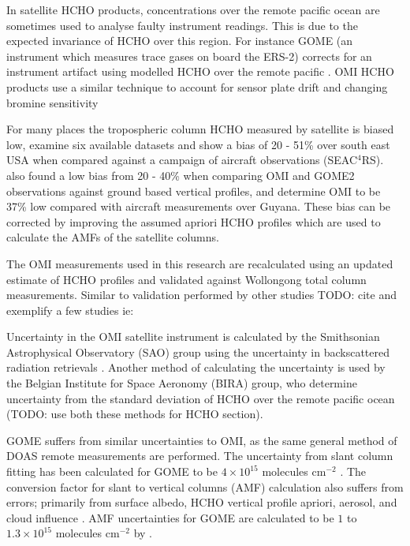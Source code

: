     In satellite HCHO products, concentrations over the remote pacific ocean are sometimes used to analyse faulty instrument readings.
    This is due to the expected invariance of HCHO over this region.
    For instance GOME (an instrument which measures trace gases on board the ERS-2) corrects for an instrument artifact using modelled HCHO over the remote pacific \citep{Shim2015}.
    OMI HCHO products use a similar technique to account for sensor plate drift and changing bromine sensitivity \citep{Abad2015}
    
    For many places the tropospheric column HCHO measured by satellite is biased low, \citet{Zhu2016} examine six available datasets and show a bias of 20 - 51\% over south east USA when compared against a campaign of aircraft observations (SEAC$^4$RS).
    \citet{DeSmedt2015} also found a low bias from 20 - 40\% when comparing OMI and GOME2 observations against ground based vertical profiles, and \citet{Barkley2013} determine OMI to be 37\% low compared with aircraft measurements over Guyana.
    These bias can be corrected by improving the assumed apriori HCHO profiles which are used to calculate the AMFs of the satellite columns.
    
    The OMI measurements used in this research are recalculated using an updated estimate of HCHO profiles and validated against Wollongong total column measurements. 
    Similar to validation performed by other studies TODO: cite and exemplify a few studies ie: \citet{Zhu2016, Marais2015, Palmer2003} 
    
    Uncertainty in the OMI satellite instrument is calculated by the Smithsonian Astrophysical Observatory (SAO) group using the uncertainty in backscattered radiation retrievals \citep{Abad2015, Abad2016}.
    Another method of calculating the uncertainty is used by the Belgian Institute for Space Aeronomy (BIRA) group, who determine uncertainty from the standard deviation of HCHO over the remote pacific ocean (TODO: use both these methods for HCHO section)\citep{DeSmedt2012, DeSmedt2015}.
    
    GOME suffers from similar uncertainties to OMI, as the same general method of DOAS remote measurements are performed.
    The uncertainty from slant column fitting has been calculated for GOME to be $4\times10^{15}$ molecules cm$^{-2}$ \citep{Chance2000, Millet2006}. 
    The conversion factor for slant to vertical columns (AMF) calculation also suffers from errors; primarily from surface albedo, HCHO vertical profile apriori, aerosol, and cloud influence \citep{Millet2006}. 
    AMF uncertainties for GOME are calculated to be $1$ to $1.3\times10^{15}$ molecules cm$^{-2}$ by \citet{Shim2005}.
